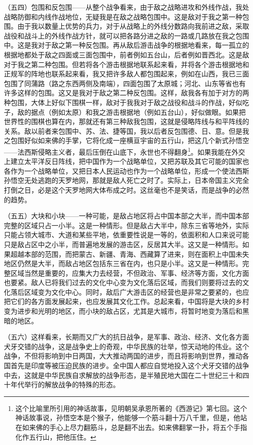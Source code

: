 \documentclass[UTF8, 12pt, a4paper]{ctexrep}
\begin{document}
（五四）包围和反包围——从整个战争看来，由于敌之战略进攻和外线作战，我处战略防御和内线作战地位，无疑我是在敌之战略包围中。这是敌对于我之第一种包围。由于我以数量上优势的兵力，对于从战略上的外线分数路向我前进之敌，采取战役和战斗上的外线作战方针，就可以把各路分进之敌的一路或几路放在我之包围中。这是我对于敌之第一种反包围。再从敌后游击战争的根据地看来，每一孤立的根据地都处于敌之四面或三面包围中，前者例如五台山，后者例如晋西北。这是敌对于我之第二种包围。但若将各个游击根据地联系起来看，并将各个游击根据地和正规军的阵地也联系起来看，我又把许多敌人都包围起来，例如在山西，我已三面包围了同蒲路（路之东西两侧及南端），四面包围了太原城；河北、山东等省也有许多这样的包围。这又是我对于敌之第二种反包围。这样，敌我各有加于对方的两种包围，大体上好似下围棋一样，敌对于我我对于敌之战役和战斗的作战，好似吃子，敌的据点（例如太原）和我之游击根据地（例如五台山），好似做眼。如果把世界性的围棋也算在内，那就还有第三种敌我包围，这就是侵略阵线与和平阵线的关系。敌以前者来包围中、苏、法、捷等国，我以后者反包围德、日、意。但是我之包围好似如来佛的手掌，它将化成一座横亘宇宙的五行山，把这几个新式孙悟空——法西斯侵略主义者，最后压倒在山底下，永世也不得翻身\footnote{这个比喻里所引用的神话故事，见明朝吴承恩所著的《西游记》第七回。这个神话故事说，孙悟空本是个猴子，他能够一个筋斗翻十万八千里，但是，他站在如来佛的手心上尽力翻筋斗，总是翻不出去。如来佛翻掌一扑，将五个手指化作五行山，把他压住。}。如果我能在外交上建立太平洋反日阵线，把中国作为一个战略单位，又把苏联及其它可能的国家也各作为一个战略单位，又把日本人民运动也作为一个战略单位，形成一个使法西斯孙悟空无处逃跑的天罗地网，那就是敌人死亡之时了。实际上，日本帝国主义完全打倒之日，必是这个天罗地网大体布成之时。这丝毫也不是笑话，而是战争的必然的趋势。

（五五）大块和小块——一种可能，是敌占地区将占中国本部之大半，而中国本部完整的区域只占一小半。这是一种情形。但是敌占大半中，除东三省等地外，实际只能占领大城市、大道和某些平地，依重要性说是一等的，依面积和人口来说可能只是敌占区中之小半，而普遍地发展的游击区，反居其大半。这又是一种情形。如果超越本部的范围，而把蒙古、新疆、青海、西藏算了进来，则在面积上中国未失地区仍然是大半，而敌占地区包括东三省在内，也只是小半。这又是一种情形。完整区域当然是重要的，应集大力去经营，不但政治、军事、经济等方面，文化方面也要紧。敌人已将我们过去的文化中心变为文化落后区域，而我们则要将过去的文化落后区域变为文化中心。同时，敌后广大游击区的经营也是非常之要紧的，也应把它们的各方面发展起来，也应发展其文化工作。总起来看，中国将是大块的乡村变为进步和光明的地区，而小块的敌占区，尤其是大城市，将暂时地变为落后和黑暗的地区。

（五六）这样看来，长期而又广大的抗日战争，是军事、政治、经济、文化各方面犬牙交错的战争，这是战争史上的奇观，中华民族的壮举，惊天动地的伟业。这个战争，不但将影响到中日两国，大大推动两国的进步，而且将影响到世界，推动各国首先是印度等被压迫民族的进步。全中国人都应自觉地投入这个犬牙交错的战争中去，这就是中华民族自求解放的战争形态，是半殖民地大国在二十世纪三十和四十年代举行的解放战争的特殊的形态。
\end{document}
